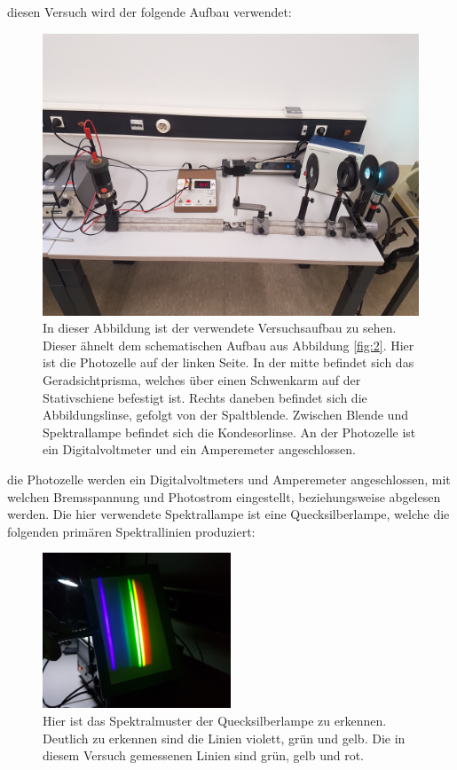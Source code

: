     \justifying diesen Versuch wird der folgende Aufbau verwendet:
    \begin{figure}[H]
        \centering
        \includegraphics[width=\textwidth]{images/Aufbau.jpg}
        \caption{In dieser Abbildung ist der verwendete Versuchsaufbau zu sehen. Dieser ähnelt dem schematischen Aufbau aus Abbildung \ref{fig:2}. Hier ist die Photozelle
        auf der linken Seite. In der mitte befindet sich das Geradsichtprisma, welches über einen Schwenkarm auf der Stativschiene befestigt ist. Rechts daneben befindet 
        sich die Abbildungslinse, gefolgt von der Spaltblende. Zwischen Blende und Spektrallampe befindet sich die Kondesorlinse. An der Photozelle ist ein Digitalvoltmeter
        und ein Amperemeter angeschlossen.}
        \label{fig:5}
    \end{figure}
    \justifying die Photozelle werden ein Digitalvoltmeters und Amperemeter angeschlossen, mit welchen Bremsspannung und Photostrom eingestellt, beziehungsweise 
    abgelesen werden. Die hier verwendete Spektrallampe ist eine Quecksilberlampe, welche die folgenden primären Spektrallinien produziert:
    \begin{figure}[H]
        \centering
        \includegraphics[width=0.5\textwidth]{images/Spektral.jpg}
        \caption{Hier ist das Spektralmuster der Quecksilberlampe zu erkennen. Deutlich zu erkennen sind die Linien violett, grün und gelb. Die in diesem Versuch gemessenen 
        Linien sind grün, gelb und rot.}
        \label{fig:6}
    \end{figure}
